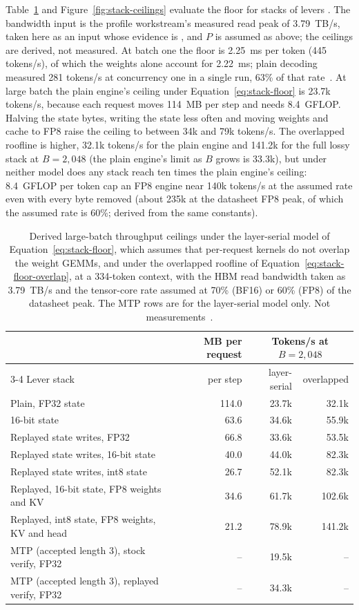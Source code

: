 Table~\ref{tab:stack-ceilings} and Figure~\ref{fig:stack-ceilings} evaluate the floor for stacks of levers . The bandwidth input is the profile workstream's measured read peak of 3.79~TB/s, taken here as an input whose evidence is , and $P$ is assumed as above; the ceilings are derived, not measured. At batch one the floor is 2.25~ms per token (445 tokens/s), of which the weights alone account for 2.22~ms; plain decoding measured 281 tokens/s at concurrency one in a single run, 63\% of that rate~. At large batch the plain engine's ceiling under Equation~\eqref{eq:stack-floor} is 23.7k tokens/s, because each request moves 114~MB per step and needs 8.4~GFLOP. Halving the state bytes, writing the state less often and moving weights and cache to FP8 raise the ceiling to between 34k and 79k tokens/s. The overlapped roofline is higher, 32.1k tokens/s for the plain engine and 141.2k for the full lossy stack at $B=2{,}048$ (the plain engine's limit as $B$ grows is 33.3k), but under neither model does any stack reach ten times the plain engine's ceiling: 8.4~GFLOP per token cap an FP8 engine near 140k tokens/s at the assumed rate even with every byte removed (about 235k at the datasheet FP8 peak, of which the assumed rate is 60\%; derived from the same constants).

\begin{table}[tbp]
\small\centering
\begin{tabular}{@{}lrrr@{}}\toprule
& MB per request & \multicolumn{2}{c}{Tokens/s at $B=2{,}048$}\\\cmidrule(l){3-4}
Lever stack & per step & layer-serial & overlapped\\\midrule
Plain, FP32 state & 114.0 & 23.7k & 32.1k\\
16-bit state & 63.6 & 34.6k & 55.9k\\
Replayed state writes, FP32 & 66.8 & 33.6k & 53.5k\\
Replayed state writes, 16-bit state & 40.0 & 44.0k & 82.3k\\
Replayed state writes, int8 state & 26.7 & 52.1k & 82.3k\\
Replayed, 16-bit state, FP8 weights and KV & 34.6 & 61.7k & 102.6k\\
Replayed, int8 state, FP8 weights, KV and head & 21.2 & 78.9k & 141.2k\\
MTP (accepted length 3), stock verify, FP32 & -- & 19.5k & --\\
MTP (accepted length 3), replayed verify, FP32 & -- & 34.3k & --\\\bottomrule
\end{tabular}
\caption{Derived large-batch throughput ceilings under the layer-serial model of Equation~\eqref{eq:stack-floor}, which assumes that per-request kernels do not overlap the weight GEMMs, and under the overlapped roofline of Equation~\eqref{eq:stack-floor-overlap}, at a 334-token context, with the HBM read bandwidth taken as 3.79~TB/s and the tensor-core rate assumed at 70\% (BF16) or 60\% (FP8) of the datasheet peak. The MTP rows are for the layer-serial model only. Not measurements~.}
\label{tab:stack-ceilings}
\end{table}

